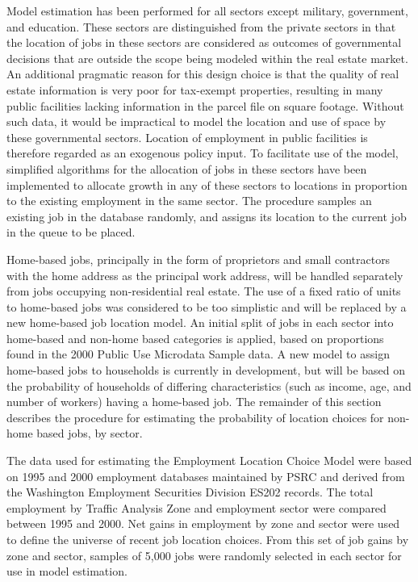 Model estimation has been performed for all sectors except
military, government, and education.  These sectors are
distinguished from the private sectors in that the location of
jobs in these sectors are considered as outcomes of governmental
decisions that are outside the scope being modeled within the real
estate market. An additional pragmatic reason for this design
choice is that the quality of real estate information is very poor
for tax-exempt properties, resulting in many public facilities
lacking information in the parcel file on square footage. Without
such data, it would be impractical to model the location and use
of space by these governmental sectors.  Location of employment in
public facilities is therefore regarded as an exogenous policy
input. To facilitate use of the model, simplified algorithms for
the allocation of jobs in these sectors have been implemented to
allocate growth in any of these sectors to locations in proportion
to the existing employment in the same sector.  The procedure
samples an existing job in the database randomly, and assigns its
location to the current job in the queue to be placed.

Home-based jobs, principally in the form of proprietors and small
contractors with the home address as the principal work address,
will be handled separately from jobs occupying non-residential
real estate.  The use of a fixed ratio of units to home-based jobs
was considered to be too simplistic and will be replaced by a new
home-based job location model.  An initial split of jobs in each
sector into home-based and non-home based categories is applied,
based on proportions found in the 2000 Public Use Microdata Sample
data.  A new model to assign home-based jobs to households is
currently in development, but will be based on the probability of
households of differing characteristics (such as income, age, and
number of workers) having a home-based job.  The remainder of this
section describes the procedure for estimating the probability of
location choices for non-home based jobs, by sector.

The data used for estimating the Employment Location Choice Model
were based on 1995 and 2000 employment databases maintained by
PSRC and derived from the Washington Employment Securities
Division ES202 records.  The total employment by Traffic Analysis
Zone and employment sector were compared between 1995 and 2000.
Net gains in employment by zone and sector were used to define the
universe of recent job location choices.  From this set of job
gains by zone and sector, samples of 5,000 jobs were randomly
selected in each sector for use in model estimation.


